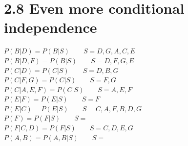 \documentclass [11pt, a4paper, oneside] {article}
\begin{document}
\section *{2.8 Even more conditional independence}
$P(B|D) = P(B|S) \qquad S = {D, G, A, C, E}$\\
$P(B|D, F) = P(B|S) \qquad S = {D, F, G, E}$\\
$P(C|D) = P(C|S) \qquad S = {D, B, G}$\\
$P(C|F, G) = P(C|S) \qquad S = {F, G}$\\
$P(C|A, E, F) = P(C|S) \qquad S = {A, E, F}$\\
$P(E|F) = P(E|S) \qquad S = {F}$\\
$P(E|C) = P(E|S) \qquad S = {C, A, F, B, D, G}$\\
$P(F) = P(F|S) \qquad S = {}$\\
$P(F|C, D) = P(F|S) \qquad S = {C, D, E, G}$\\
$P(A, B) = P(A, B|S) \qquad S = {}$\\
\end{document}
